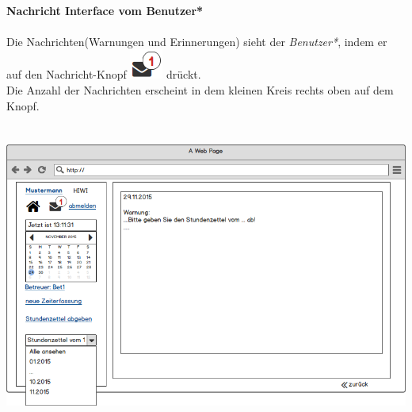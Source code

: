 \newpage
\textbf{\\Nachricht Interface vom Benutzer*}\\
\\
Die Nachrichten(Warnungen und Erinnerungen) sieht der \emph{Benutzer*}, indem er auf den Nachricht-Knopf
\includegraphics[scale=.4]{UI/Button/Nachricht.png} drückt.\\
Die Anzahl der Nachrichten erscheint in dem kleinen Kreis rechts oben auf dem Knopf.\\
\\
\\
\includegraphics[width=\linewidth]{UI/Benutzer/Nachricht.png}

\newpage
